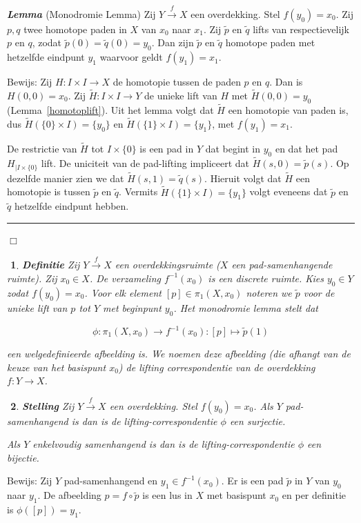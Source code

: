 \documentclass[12pt]{book}
\newcommand{\bew}{{\sc Bewijs: }}
\newcommand{\B}{\rule{1mm}{0mm} \hfill $\Box$ }
\newtheorem{stelh}{$\!\!$}[section]
\newenvironment{stel}{\begin{stelh}{\em {\bf Stelling }}}{\end{stelh}}
\newenvironment{lem}{\begin{lemh}{\em {\bf Lemma }}}{\end{lemh}}
\newtheorem{dfh}[stelh]{$\!\!$}
\newenvironment{df}{\begin{dfh} \em {\bf Definitie }}{\end{dfh}}
\begin{document}
\begin{lem} {\rm (Monodromie Lemma)}
Zij $Y\stackrel{f}{\to} X$ een overdekking. Stel $f(y_0)=x_0$.  Zij $p,q$ twee homotope paden in $X$ van $x_0$ naar $x_1$. Zij $\widetilde{p}$ en $\widetilde{q}$ lifts van respectievelijk $p$ en $q$, zodat $\widetilde{p}(0)=\widetilde{q}(0)=y_0$. Dan zijn $\widetilde{p}$ en  $\widetilde{q}$ homotope paden met hetzelfde eindpunt $y_1$ waarvoor geldt $f(y_1)=x_1$.
\end{lem}

\bew Zij $H:I\times I\to X$ de homotopie tussen de paden $p$ en $q$. Dan is $H(0,0)=x_0$. Zij $\widetilde{H}:I\times I \to Y$ de unieke lift van $H$ met $\widetilde{H}(0,0)=y_0$ (Lemma~\ref{homotoplift}). Uit het lemma volgt dat $\widetilde{H}$ een homotopie van paden is, dus $\widetilde{H}(\{0\}\times I)=\{y_0\}$ en $\widetilde{H}(\{1\}\times I)=\{y_1\}$, met $f(y_1)=x_1$. 

De restrictie van $\widetilde{H}$ tot $I\times \{0\}$ is een pad in $Y$ dat begint in $y_0$ en dat het pad 
$H_{| I \times \{0\}}$ lift. De uniciteit van de pad-lifting impliceert dat $\widetilde{H}(s,0)=\widetilde{p}(s)$.
Op dezelfde manier zien we dat $\widetilde{H}(s,1)=\widetilde{q}(s)$. Hieruit volgt dat $\widetilde{H}$ een homotopie is tussen $\widetilde{p}$ en $\widetilde{q}$. Vermits  $\widetilde{H}(\{1\} \times I)=\{y_1\}$ volgt eveneens dat $\widetilde{p}$ en $\widetilde{q}$  hetzelfde eindpunt hebben. \B 

\begin{df} Zij $Y\stackrel{f}{\to} X$ een overdekkingsruimte ($X$ een pad-samenhangende ruimte). Zij $x_0\in X$. De verzameling
$f^{-1}(x_0)$ is een discrete ruimte. Kies $y_0\in Y$ zodat $f(y_0)=x_0$. Voor elk element $[p]\in \pi_{1}(X,x_0)$ noteren we $\widetilde{p}$ voor de unieke lift van $p$ tot $Y$ met 
beginpunt $y_0$. Het monodromie lemma stelt dat

 $$\phi:\pi_1(X,x_0)\to f^{-1}(x_0): [p] \mapsto \widetilde{p}(1)$$
 
een welgedefinieerde afbeelding is. We noemen deze afbeelding (die afhangt van de keuze van het basispunt $x_0$) de  {\em lifting correspondentie} van de overdekking $f:Y\to X$.
\end{df}

\begin{stel} Zij $Y\stackrel{f}{\to} X$ een overdekking. Stel $f(y_0)=x_0$. Als $Y$ pad-samenhangend is dan is de lifting-correspondentie $\phi$ een surjectie. 

Als $Y$ enkelvoudig samenhangend is dan is de lifting-correspondentie $\phi$ een bijectie.
\label{corresp}
\end{stel}
\bew Zij $Y$ pad-samenhangend en $y_1\in f^{-1}(x_0)$. Er is een pad $\widetilde{p}$ in $Y$ van $y_0$ naar $y_1$.  De afbeelding $p=f\circ \widetilde{p}$  is een lus in $X$ met basispunt $x_0$ en per definitie is $\phi([p])=y_1$.
\end{document}
